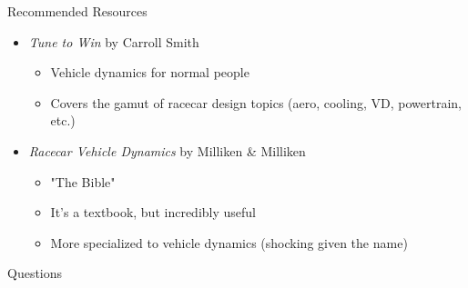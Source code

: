 \documentclass[aspectratio=169]{beamer}
\begin{document}
\begin{frame}{Recommended Resources}

    \begin{itemize}
        \item \textit{Tune to Win} by Carroll Smith
            \begin{itemize}
                \item Vehicle dynamics for normal people
                \item Covers the gamut of racecar design topics (aero, cooling, VD, powertrain, etc.)
            \end{itemize}
        \item \textit{Racecar Vehicle Dynamics} by Milliken \& Milliken
            \begin{itemize}
                \item "The Bible"
                \item It's a textbook, but incredibly useful
                \item More specialized to vehicle dynamics (shocking given the name)
            \end{itemize}
    \end{itemize}
\end{frame}


\begin{frame}{Questions}

\end{frame}
\end{document}

